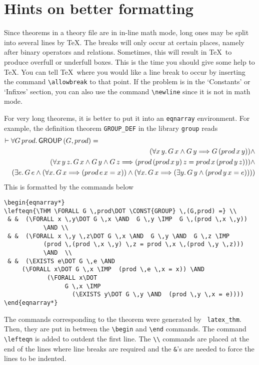 \section{Hints on better  formatting}

Since theorems in a theory file are in in-line math mode, long ones
may be split into several lines by \TeX. The breaks will only occur at
certain places, namely after binary operators and relations.
Sometimes, this will result in \TeX\ to produce overfull or underfull
boxes. This is the time you should give some help to \TeX. You can
tell \TeX\ where you would like a line
break to occur by inserting the command \verb|\allowbreak|  to that point.
If the problem is in the `Constants' or `Infixes' section, you can also use the command \verb|\newline| since
it is not in math mode.

For very long theorems, it is better to put it into an {\tt eqnarray}
environment. For example, the definition theorem {\tt GROUP\_DEF} in the
library {\tt group} reads
\begin{eqnarray*}
\lefteqn{\THM \FORALL G \,prod\DOT \CONST{GROUP} \,(G,prod) =} \\
 & &     (\FORALL x \,y\DOT G \,x \AND  G \,y \IMP  G \,(prod \,x \,y))
           \AND \\
 & &     (\FORALL x \,y \,z\DOT G \,x \AND  G \,y \AND  G \,z \IMP 
           (prod \,(prod \,x \,y) \,z = prod \,x \,(prod \,y \,z)))
           \AND  \\
 & &     (\EXISTS e\DOT G \,e \AND  
 	   (\FORALL x\DOT G \,x \IMP  (prod \,e \,x = x)) \AND 
              (\FORALL x\DOT
                   G \,x \IMP 
                      (\EXISTS y\DOT G \,y \AND  (prod \,y \,x = e))))
\end{eqnarray*}
This is formatted by the commands below
\begin{verbatim}
\begin{eqnarray*}
\lefteqn{\THM \FORALL G \,prod\DOT \CONST{GROUP} \,(G,prod) =} \\
 & &  (\FORALL x \,y\DOT G \,x \AND  G \,y \IMP  G \,(prod \,x \,y))
           \AND \\
 & &  (\FORALL x \,y \,z\DOT G \,x \AND  G \,y \AND  G \,z \IMP 
           (prod \,(prod \,x \,y) \,z = prod \,x \,(prod \,y \,z)))
           \AND  \\
 & &  (\EXISTS e\DOT G \,e \AND  
 	 (\FORALL x\DOT G \,x \IMP  (prod \,e \,x = x)) \AND 
            (\FORALL x\DOT
                 G \,x \IMP 
                   (\EXISTS y\DOT G \,y \AND  (prod \,y \,x = e))))
\end{eqnarray*}
\end{verbatim}
The commands corresponding to the theorem were generated by {\tt
latex\_thm}. Then, they are put in between the \verb|\begin| and
\verb|\end| commands. The command \verb|\lefteqn| is added to outdent
the first line. The \verb|\\| commands are placed at the end of
the lines where line breaks are required and the \verb|&|'s are needed
to force the lines to be indented.

